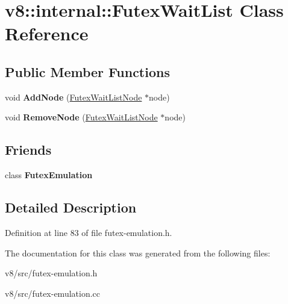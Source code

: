 \hypertarget{classv8_1_1internal_1_1FutexWaitList}{}\section{v8\+:\+:internal\+:\+:Futex\+Wait\+List Class Reference}
\label{classv8_1_1internal_1_1FutexWaitList}
\subsection*{Public Member Functions}
\begin{DoxyCompactItemize}
\item 
\mbox{\label{classv8_1_1internal_1_1FutexWaitList_a0f8a0f9c4de08fe17ad6211e97800a34}} 
void {\bfseries Add\+Node} (\mbox{\hyperlink{classv8_1_1internal_1_1FutexWaitListNode}{Futex\+Wait\+List\+Node}} $\ast$node)
\item 
\mbox{\label{classv8_1_1internal_1_1FutexWaitList_a7aae049debaca1319024523380a995f9}} 
void {\bfseries Remove\+Node} (\mbox{\hyperlink{classv8_1_1internal_1_1FutexWaitListNode}{Futex\+Wait\+List\+Node}} $\ast$node)
\end{DoxyCompactItemize}
\subsection*{Friends}
\begin{DoxyCompactItemize}
\item 
\mbox{\label{classv8_1_1internal_1_1FutexWaitList_aac567adb4503b9486e8d84b85a01c1d8}} 
class {\bfseries Futex\+Emulation}
\end{DoxyCompactItemize}


\subsection{Detailed Description}


Definition at line 83 of file futex-\/emulation.\+h.



The documentation for this class was generated from the following files\+:\begin{DoxyCompactItemize}
\item 
v8/src/futex-\/emulation.\+h\item 
v8/src/futex-\/emulation.\+cc\end{DoxyCompactItemize}
